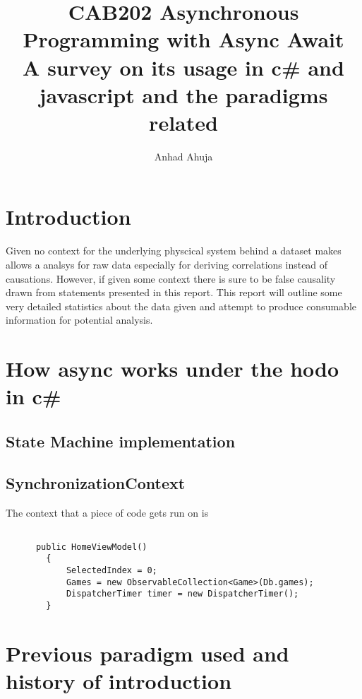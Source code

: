 \documentclass{article}
\title{CAB202 Asynchronous Programming with Async Await
\\\large A survey on its usage in c\# and javascript and the paradigms related}
\author{Anhad Ahuja}
\begin{document}
\maketitle



\section{Introduction}


Given no context for the underlying physcical system behind a dataset makes allows a analsys for raw data especially for deriving correlations instead of causations. However, if given some context there is sure to be false causality drawn from statements presented in this report. This report will outline some very detailed statistics about the data given and attempt to produce consumable information for potential analysis.



\newpage

\section{How async works under the hodo in c\#}
\subsection{State Machine implementation}

\subsection{SynchronizationContext}
The context that a piece of code gets run on is

\begin{lstlisting}[language={[Sharp]C}]

      public HomeViewModel()
        {
            SelectedIndex = 0;
            Games = new ObservableCollection<Game>(Db.games);
            DispatcherTimer timer = new DispatcherTimer();
        }
\end{lstlisting}

\section{Previous paradigm used and history of introduction}
\end{document}
